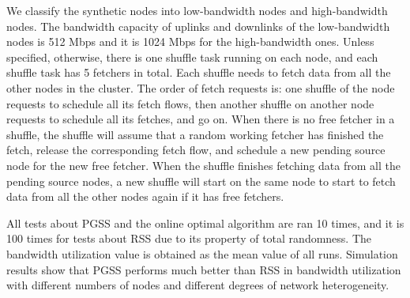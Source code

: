 \documentclass[10pt,journal,compsoc]{IEEEtran}
\begin{document}
We classify the synthetic nodes into low-bandwidth nodes and
high-bandwidth nodes.
The bandwidth capacity of uplinks and downlinks of the
low-bandwidth nodes is 512 Mbps %
and it is 1024 Mbps for the high-bandwidth ones. Unless specified, 
otherwise, there is one shuffle task running on each node, 
and each shuffle task has 5 fetchers in total. Each shuffle needs to fetch data from all the other nodes in the cluster.
The order of fetch requests is:
one shuffle of the node requests to schedule all its fetch flows,
then another shuffle on another node requests to schedule all its fetches, 
and go on. 
When there is no free fetcher in a shuffle, the shuffle will assume
that a random working fetcher has finished the
fetch, release the corresponding fetch flow, and schedule a new pending
source node for the new free fetcher.
When the shuffle finishes fetching data from all the pending source
nodes, a new shuffle will start on the same node to start to fetch
data from all the other nodes again if it has free fetchers.

All tests about PGSS and the online optimal algorithm are ran
10 times, and it is 100 times for
tests about RSS due to its property of total randomness.
The bandwidth utilization value is obtained as the mean value of all runs.
Simulation results show that PGSS performs much better than RSS
in bandwidth utilization
with different numbers of nodes and different degrees of network heterogeneity. 
\end{document}
